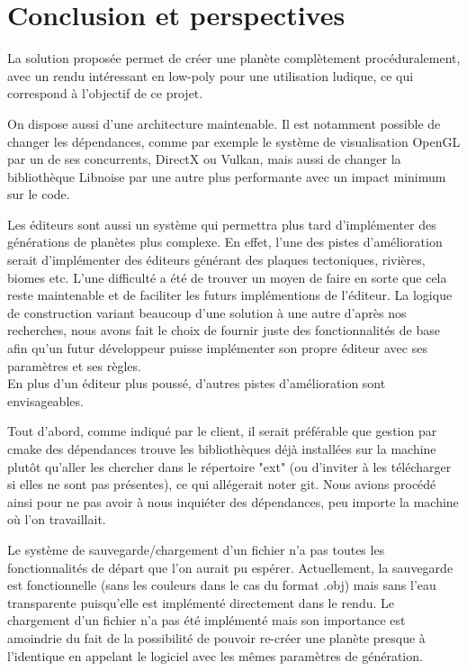 \documentclass[a4paper]{article}
\begin{document}
\newpage
\section{Conclusion et perspectives}

La solution proposée permet de créer une planète complètement procéduralement, avec un rendu intéressant en low-poly pour une utilisation ludique, ce qui correspond à l'objectif de ce projet. 

On dispose aussi d'une architecture maintenable. Il est notamment possible de changer les dépendances, comme par exemple le système de visualisation OpenGL par un de ses concurrents, DirectX ou Vulkan, mais aussi de changer la bibliothèque Libnoise par une autre plus performante avec un impact minimum sur le code.

Les éditeurs sont aussi un système qui permettra plus tard d'implémenter des générations de planètes plus complexe. En effet, l'une des pistes d'amélioration serait d'implémenter des éditeurs générant des plaques tectoniques, rivières, biomes etc. L'une difficulté a été de trouver un moyen de faire en sorte que cela reste maintenable et de faciliter les futurs implémentions de l'éditeur. La logique de construction variant beaucoup d'une solution à une autre d'après nos recherches, nous avons fait le choix de fournir juste des fonctionnalités de base afin qu'un futur développeur puisse implémenter son propre éditeur avec ses paramètres et ses règles.\\

En plus d'un éditeur plus poussé, d'autres pistes d'amélioration sont envisageables.

Tout d'abord, comme indiqué par le client, il serait préférable que gestion par cmake des dépendances trouve les bibliothèques déjà installées sur la machine plutôt qu'aller les chercher dans le répertoire "ext" (ou d'inviter à les télécharger si elles ne sont pas présentes), ce qui allégerait noter git. Nous avions procédé ainsi pour ne pas avoir à nous inquiéter des dépendances, peu importe la machine où l'on travaillait.

Le système de sauvegarde/chargement d'un fichier n'a pas toutes les fonctionnalités de départ que l'on aurait pu espérer. Actuellement, la sauvegarde est fonctionnelle (sans les couleurs dans le cas du format .obj) mais sans l'eau transparente puisqu'elle est implémenté directement dans le rendu. Le chargement d'un fichier n'a pas été implémenté mais son importance est amoindrie du fait de la possibilité de pouvoir re-créer une planète presque à l'identique en appelant le logiciel avec les mêmes paramètres de génération.
\end{document}

